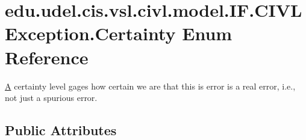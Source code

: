 \hypertarget{enumedu_1_1udel_1_1cis_1_1vsl_1_1civl_1_1model_1_1IF_1_1CIVLException_1_1Certainty}{}\section{edu.\+udel.\+cis.\+vsl.\+civl.\+model.\+I\+F.\+C\+I\+V\+L\+Exception.\+Certainty Enum Reference}
\label{enumedu_1_1udel_1_1cis_1_1vsl_1_1civl_1_1model_1_1IF_1_1CIVLException_1_1Certainty}


\hyperlink{structA}{A} certainty level gages how certain we are that this is error is a real error, i.\+e., not just a spurious error.  


\subsection*{Public Attributes}
